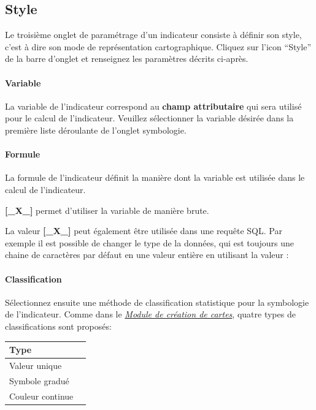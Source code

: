 \documentclass[letterpaper,10pt,french]{sphinxmanual}
\begin{document}
\subsection{Style}
\label{indicators/indicatorspanel:style}
Le troisième onglet de paramétrage d'un indicateur consiste à
définir son style, c'est à dire son mode de représentation
cartographique. Cliquez sur l'icon ``Style'' de la barre d'onglet et
renseignez les paramètres décrits ci-après.
\paragraph{Variable}

La variable de l'indicateur correspond au \textbf{champ attributaire} qui sera utilisé pour le calcul de l'indicateur. Veuillez sélectionner la variable désirée dans la première liste déroulante de l'onglet symbologie.
\paragraph{Formule}

La formule de l'indicateur définit la manière dont la variable est utilisée dans le calcul de l'indicateur.

\textbf{{[}\_X\_{]}} permet d'utiliser la variable de manière brute.

La valeur \textbf{{[}\_X\_{]}} peut également être utilisée dans une requête
SQL. Par exemple il est possible de changer le type de la données, qui
est toujours une chaine de caractères par défaut en une valeur entière
en utilisant la valeur : 
\paragraph{Classification}

Sélectionnez ensuite une méthode de classification statistique pour la
symbologie de l'indicateur. Comme dans le {\hyperref[maps/index::doc]{\emph{\emph{Module de création de cartes}}}}, quatre
types de classifications sont proposés:

\begin{tabulary}{\linewidth}{|L|L|}
\hline

\textbf{Type}
 & \\
\hline
Valeur unique
 & \\
\hline
Symbole gradué
 & \\
\hline
Couleur continue
 & \\
\hline\end{tabulary}
\end{document}
